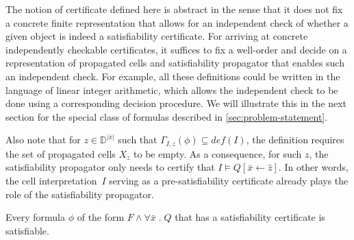 \documentclass[runningheads]{llncs}
\newcommand{\numvar}[1]{|#1|}
\newcommand{\domain}{\mathbb{D}}
\newcommand{\subst}[3]{#1[#2\leftarrow #3]}
\newcommand{\repr}[1]{\hat{#1}}
\begin{document}
The notion of certificate defined here is abstract in the sense that it does not fix a concrete finite representation that allows for an independent check of whether a given object is indeed a satisfiability certificate. For arriving at concrete independently checkable certificates, it suffices to fix a well-order and decide on a representation of propagated cells and satisfiability propagator that enables such an independent check. For example, all these definitions could be written in the language of linear integer arithmetic, which allows the independent check to be done using a corresponding decision procedure. We will illustrate this in the next section for the special class of formulas described in \cref{sec:problem-statement}.


Also note that for $z\in\domain^{\numvar{\bar{x}}}$ such that $\Gamma_{I,z}(\phi)\subseteq \mathit{def}(I)$, the definition requires the set of propagated cells $X_z$ to be empty. As a consequence, for such $z$, the satisfiability propagator only needs to certify that $I\models \subst{Q}{\bar{x}}{\repr{z}}$. In other words, the cell interpretation~$I$ serving as a pre-satisfiability certificate already plays the role of the satisfiability propagator. 

\begin{theorem}\label{thm:certThenSat}
	Every formula $\phi$  of the form $F\wedge \forall \bar{x}\;.\; Q$ that has a satisfiability certificate is satisfiable.
\end{theorem}
\end{document}
